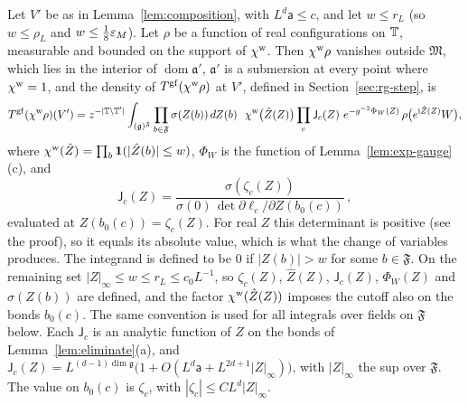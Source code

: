 \begin{proposition}\label{prop:exact-step}
Let $V'$ be as in Lemma~\ref{lem:composition}, with $L^d\mathsf a\le c$, and let $w\le r_L$ (so $w\le\rho_L$ and $w\le\frac18\varepsilon_M$). Let $\rho$ be a function of real configurations on $\mathbb T$, measurable and bounded on the support of $\chi^{\rm w}$. Then $\chi^{\rm w}\rho$ vanishes outside $\mathfrak M$, which lies in the interior of $\operatorname{dom}\mathfrak a'$, $\mathfrak a'$ is a submersion at every point where $\chi^{\rm w}=1$, and the density of $T^{\rm gf}(\chi^{\rm w}\rho)$ at $V'$, defined in Section~\ref{sec:rg-step}, is
\[
T^{\rm gf}(\chi^{\rm w}\rho)(V')=z^{-|\T\setminus\T'|}\int_{(\mathfrak g)^{\mathfrak F}}\prod_{b\in\mathfrak F}\sigma(Z(b))\,dZ(b)\ \ \chi^{\rm w}\big(\hat Z(Z)\big)\prod_c\mathsf J_c(Z)\ e^{-g^{-2}\Phi_W(Z)}\,\rho\big(e^{\ii\hat Z(Z)}W\big),
\]
where $\chi^{\rm w}(\hat Z)=\prod_b\mathbf 1(|\hat Z(b)|\le w)$, $\Phi_W$ is the function of Lemma~\ref{lem:exp-gauge}(c), and
\[
\mathsf J_c(Z)=\frac{\sigma(\zeta_c(Z))}{\sigma(0)\,\det\partial\ell_c/\partial Z(b_0(c))}\,,
\]
evaluated at $Z(b_0(c))=\zeta_c(Z)$. For real $Z$ this determinant is positive (see the proof), so it equals its absolute value, which is what the change of variables produces. The integrand is defined to be $0$ if $|Z(b)|>w$ for some $b\in\mathfrak F$. On the remaining set $|Z|_\infty\le w\le r_L\le c_0L^{-1}$, so $\zeta_c(Z)$, $\hat Z(Z)$, $\mathsf J_c(Z)$, $\Phi_W(Z)$ and $\sigma(Z(b))$ are defined, and the factor $\chi^{\rm w}(\hat Z(Z))$ imposes the cutoff also on the bonds $b_0(c)$. The same convention is used for all integrals over fields on $\mathfrak F$ below. Each $\mathsf J_c$ is an analytic function of $Z$ on the bonds of Lemma~\ref{lem:eliminate}(a), and $\mathsf J_c(Z)=L^{(d-1)\dim\mathfrak g}\big(1+O(L^d\mathsf a+L^{2d+1}|Z|_\infty)\big)$, with $|Z|_\infty$ the sup over $\mathfrak F$. The value on $b_0(c)$ is $\zeta_c$, with $|\zeta_c|\le CL^d|Z|_\infty$.
\end{proposition}

